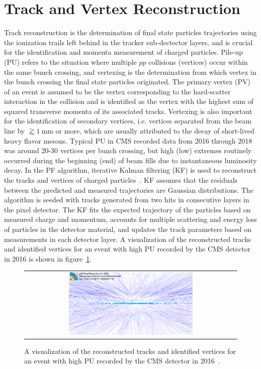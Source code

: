 \section{Track and Vertex Reconstruction}
Track reconstruction is the determination of final state particles trajectories using the ionization trails left behind in the tracker sub-dectector layers, and is crucial for the identification and momenta measurement of charged particles.
Pile-up (PU) refers to the situation where multiple $pp$ collisions (vertices) occur within the same bunch crossing, and vertexing is the determination from which vertex in the bunch crossing the final state particles originated.
The primary vertex (PV) of an event is assumed to be the vertex corresponding to the hard-scatter interaction in the collision and is identified as the vertex with the highest sum of squared transverse momenta of its associated tracks.
Vertexing is also important for the identification of secondary vertices, i.e. vertices separated from the beam line by $\gtrapprox \SI{1}{\mm}$ or more, which are usually attributed to the decay of short-lived heavy flavor mesons.
Typical PU in CMS recorded data from 2016 through 2018 was around 20-30 vertices per bunch crossing, but high (low) extremes routinely occurred during the beginning (end) of beam fills due to instantaneous 
luminosity decay.
In the PF algorithm, iterative Kalman filtering (KF) is used to reconstruct the tracks and vertices of charged particles~\cite{Sirunyan:2270046}.
KF assumes that the residuals between the predicted and measured trajectories are Gaussian distributions.
The algorithm is seeded with tracks generated from two hits in consecutive layers in the pixel detector.
The KF fits the expected trajectory of the particles based on measured charge and momentum, accounts for multiple scattering and energy loss of particles in the detector material, and updates the track parameters based on measurements in each detector layer.
A visualization of the reconstructed tracks and identified vertices for an event with high PU recorded by the CMS detector in 2016 is shown in figure~\ref{Pileup}.
\begin{figure}[!htb]
  \begin{center}
    \begin{tabular}{c}
        \includegraphics[width=0.6\textwidth]{fig_Event_Reconstruction/Pileup.png}
    \end{tabular}
    \caption{A visualization of the reconstructed tracks and identified vertices for an event with high PU recorded by the CMS detector in 2016~\cite{Collaboration:2231915}.
            }
    \label{Pileup}
  \end{center}
\end{figure}

